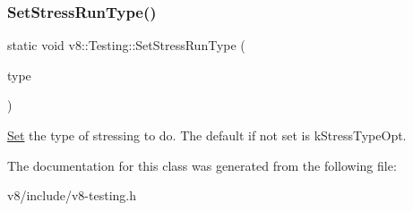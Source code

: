 \subsubsection{\texorpdfstring{Set\+Stress\+Run\+Type()}{SetStressRunType()}}
{\footnotesize\ttfamily static void v8\+::\+Testing\+::\+Set\+Stress\+Run\+Type (\begin{DoxyParamCaption}\item[{Stress\+Type}]{type }\end{DoxyParamCaption})\hspace{0.3cm}{\ttfamily [static]}}

\mbox{\hyperlink{classv8_1_1Set}{Set}} the type of stressing to do. The default if not set is k\+Stress\+Type\+Opt. 

The documentation for this class was generated from the following file\+:\begin{DoxyCompactItemize}
\item 
v8/include/v8-\/testing.\+h\end{DoxyCompactItemize}
